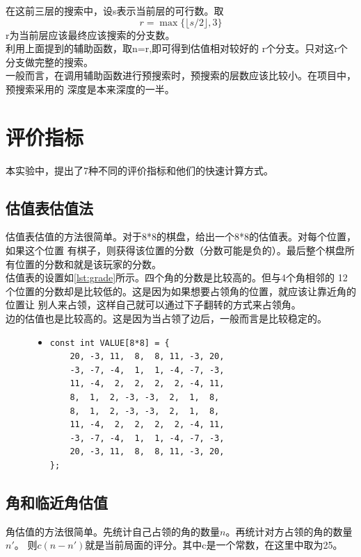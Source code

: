 \documentclass[a4paper]{article}
\begin{document}
在这前三层的搜索中，设s表示当前层的可行数。取$$r = \max \{\lfloor s / 2 \rfloor, 3\}$$
r为当前层应该最终应该搜索的分支数。\\

利用上面提到的辅助函数，取n=r,即可得到估值相对较好的
r个分支。只对这r个分支做完整的搜索。\\

一般而言，在调用辅助函数进行预搜索时，预搜索的层数应该比较小。在项目中，预搜索采用的
深度是本来深度的一半。

\section{评价指标}
本实验中，提出了7种不同的评价指标和他们的快速计算方式。
\subsection{估值表估值法}
估值表估值的方法很简单。对于8*8的棋盘，给出一个8*8的估值表。对每个位置，如果这个位置
有棋子，则获得该位置的分数（分数可能是负的）。最后整个棋盘所有位置的分数和就是该玩家的分数。\\

估值表的设置如\autoref{lst:grade}所示。四个角的分数是比较高的。但与4个角相邻的
12个位置的分数却是比较低的。这是因为如果想要占领角的位置，就应该让靠近角的位置让
别人来占领，这样自己就可以通过下子翻转的方式来占领角。\\

边的估值也是比较高的。这是因为当占领了边后，一般而言是比较稳定的。\\

\begin{figure}[!hbt]
\begin{itemize}
\item[] \begin{lstlisting}[style=mycpp, label=lst:grade, caption=估值表的设置]
const int VALUE[8*8] = {
    20, -3, 11,  8,  8, 11, -3, 20,
    -3, -7, -4,  1,  1, -4, -7, -3,
    11, -4,  2,  2,  2,  2, -4, 11,
    8,  1,  2, -3, -3,  2,  1,  8,
    8,  1,  2, -3, -3,  2,  1,  8,
    11, -4,  2,  2,  2,  2, -4, 11,
    -3, -7, -4,  1,  1, -4, -7, -3,
    20, -3, 11,  8,  8, 11, -3, 20,
};
\end{lstlisting}
\end{itemize}
\end{figure}

\subsection{角和临近角估值}
角估值的方法很简单。先统计自己占领的角的数量$n$。再统计对方占领的角的数量$n'$。 
则$c(n - n')$就是当前局面的评分。其中c是一个常数，在这里中取为25。\\
\end{document}
